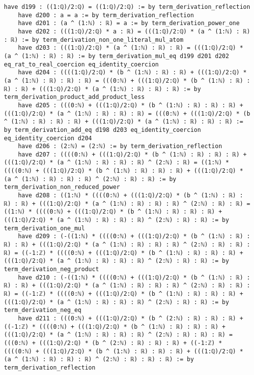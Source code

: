 \documentclass{article}
\begin{document}
\begin{tcolorbox}[colback=white!10, width=\linewidth]
\begin{lstlisting}[language=Lean4]
    have d199 : ((1:ℚ)/2:ℚ) = ((1:ℚ)/2:ℚ) := by term_derivation_reflection
    have d200 : a = a := by term_derivation_reflection
    have d201 : (a ^ (1:ℕ) : ℝ) = a := by term_derivation_power_one
    have d202 : (((1:ℚ)/2:ℚ) * a : ℝ) = (((1:ℚ)/2:ℚ) * (a ^ (1:ℕ) : ℝ) : ℝ) := by term_derivation_non_one_literal_mul_atom
    have d203 : (((1:ℚ)/2:ℚ) * (a ^ (1:ℕ) : ℝ) : ℝ) = (((1:ℚ)/2:ℚ) * (a ^ (1:ℕ) : ℝ) : ℝ) := by term_derivation_mul_eq d199 d201 d202 eq_rat_to_real_coercion eq_identity_coercion
    have d204 : ((((1:ℚ)/2:ℚ) * (b ^ (1:ℕ) : ℝ) : ℝ) + (((1:ℚ)/2:ℚ) * (a ^ (1:ℕ) : ℝ) : ℝ) : ℝ) = (((0:ℕ) + (((1:ℚ)/2:ℚ) * (b ^ (1:ℕ) : ℝ) : ℝ) : ℝ) + (((1:ℚ)/2:ℚ) * (a ^ (1:ℕ) : ℝ) : ℝ) : ℝ) := by term_derivation_product_add_product_less
    have d205 : (((0:ℕ) + (((1:ℚ)/2:ℚ) * (b ^ (1:ℕ) : ℝ) : ℝ) : ℝ) + (((1:ℚ)/2:ℚ) * (a ^ (1:ℕ) : ℝ) : ℝ) : ℝ) = (((0:ℕ) + (((1:ℚ)/2:ℚ) * (b ^ (1:ℕ) : ℝ) : ℝ) : ℝ) + (((1:ℚ)/2:ℚ) * (a ^ (1:ℕ) : ℝ) : ℝ) : ℝ) := by term_derivation_add_eq d198 d203 eq_identity_coercion eq_identity_coercion d204
    have d206 : (2:ℕ) = (2:ℕ) := by term_derivation_reflection
    have d207 : ((((0:ℕ) + (((1:ℚ)/2:ℚ) * (b ^ (1:ℕ) : ℝ) : ℝ) : ℝ) + (((1:ℚ)/2:ℚ) * (a ^ (1:ℕ) : ℝ) : ℝ) : ℝ) ^ (2:ℕ) : ℝ) = ((1:ℕ) * ((((0:ℕ) + (((1:ℚ)/2:ℚ) * (b ^ (1:ℕ) : ℝ) : ℝ) : ℝ) + (((1:ℚ)/2:ℚ) * (a ^ (1:ℕ) : ℝ) : ℝ) : ℝ) ^ (2:ℕ) : ℝ) : ℝ) := by term_derivation_non_reduced_power
    have d208 : ((1:ℕ) * ((((0:ℕ) + (((1:ℚ)/2:ℚ) * (b ^ (1:ℕ) : ℝ) : ℝ) : ℝ) + (((1:ℚ)/2:ℚ) * (a ^ (1:ℕ) : ℝ) : ℝ) : ℝ) ^ (2:ℕ) : ℝ) : ℝ) = ((1:ℕ) * ((((0:ℕ) + (((1:ℚ)/2:ℚ) * (b ^ (1:ℕ) : ℝ) : ℝ) : ℝ) + (((1:ℚ)/2:ℚ) * (a ^ (1:ℕ) : ℝ) : ℝ) : ℝ) ^ (2:ℕ) : ℝ) : ℝ) := by term_derivation_one_mul
    have d209 : (-((1:ℕ) * ((((0:ℕ) + (((1:ℚ)/2:ℚ) * (b ^ (1:ℕ) : ℝ) : ℝ) : ℝ) + (((1:ℚ)/2:ℚ) * (a ^ (1:ℕ) : ℝ) : ℝ) : ℝ) ^ (2:ℕ) : ℝ) : ℝ) : ℝ) = ((-1:ℤ) * ((((0:ℕ) + (((1:ℚ)/2:ℚ) * (b ^ (1:ℕ) : ℝ) : ℝ) : ℝ) + (((1:ℚ)/2:ℚ) * (a ^ (1:ℕ) : ℝ) : ℝ) : ℝ) ^ (2:ℕ) : ℝ) : ℝ) := by term_derivation_neg_product
    have d210 : (-((1:ℕ) * ((((0:ℕ) + (((1:ℚ)/2:ℚ) * (b ^ (1:ℕ) : ℝ) : ℝ) : ℝ) + (((1:ℚ)/2:ℚ) * (a ^ (1:ℕ) : ℝ) : ℝ) : ℝ) ^ (2:ℕ) : ℝ) : ℝ) : ℝ) = ((-1:ℤ) * ((((0:ℕ) + (((1:ℚ)/2:ℚ) * (b ^ (1:ℕ) : ℝ) : ℝ) : ℝ) + (((1:ℚ)/2:ℚ) * (a ^ (1:ℕ) : ℝ) : ℝ) : ℝ) ^ (2:ℕ) : ℝ) : ℝ) := by term_derivation_neg_eq
    have d211 : (((0:ℕ) + (((1:ℚ)/2:ℚ) * (b ^ (2:ℕ) : ℝ) : ℝ) : ℝ) + ((-1:ℤ) * ((((0:ℕ) + (((1:ℚ)/2:ℚ) * (b ^ (1:ℕ) : ℝ) : ℝ) : ℝ) + (((1:ℚ)/2:ℚ) * (a ^ (1:ℕ) : ℝ) : ℝ) : ℝ) ^ (2:ℕ) : ℝ) : ℝ) : ℝ) = (((0:ℕ) + (((1:ℚ)/2:ℚ) * (b ^ (2:ℕ) : ℝ) : ℝ) : ℝ) + ((-1:ℤ) * ((((0:ℕ) + (((1:ℚ)/2:ℚ) * (b ^ (1:ℕ) : ℝ) : ℝ) : ℝ) + (((1:ℚ)/2:ℚ) * (a ^ (1:ℕ) : ℝ) : ℝ) : ℝ) ^ (2:ℕ) : ℝ) : ℝ) : ℝ) := by term_derivation_reflection

\end{lstlisting}
\end{tcolorbox}
\end{document}
